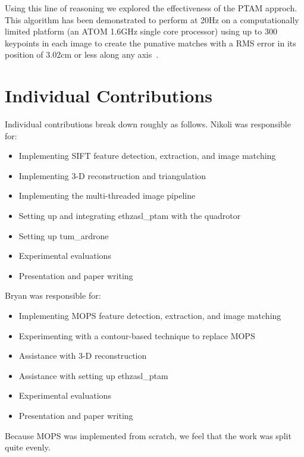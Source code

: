 \documentclass{acmsiggraph}
\begin{document}
Using this line of reasoning we explored the effectiveness of the PTAM approch.  This algorithm has been demonstrated to
perform at 20Hz on a computationally limited platform (an ATOM 1.6GHz single core processor) using up to 300 keypoints in each
image to create the punative matches with a RMS error in its position of 3.02cm or less along any axis~\cite{weiss2011}.


\section{Individual Contributions}
Individual contributions break down roughly as follows. Nikoli was responsible for:
\begin{itemize}
\item Implementing SIFT feature detection, extraction, and image matching
\item Implementing 3-D reconstruction and triangulation
\item Implementing the multi-threaded image pipeline
\item Setting up and integrating ethzasl\_ptam with the quadrotor
\item Setting up tum\_ardrone
\item Experimental evaluations
\item Presentation and paper writing
\end{itemize}

Bryan was responsible for:
\begin{itemize}
\item Implementing MOPS feature detection, extraction, and image matching
\item Experimenting with a contour-based technique to replace MOPS
\item Assistance with 3-D reconstruction
\item Assistance with setting up ethzasl\_ptam
\item Experimental evaluations
\item Presentation and paper writing
\end{itemize}

Because MOPS was implemented from scratch, we feel that the work was split quite evenly.



\end{document}
